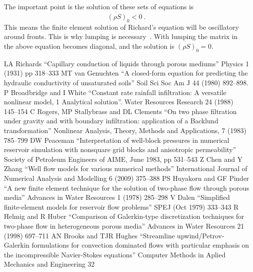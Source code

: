 \documentclass[]{scrreprt}
\begin{document}
The important point is the solution of these sets of equations is
\begin{equation}
\dot{(\rho S)}_{0} < 0 \ .
\end{equation}
This means the finite element solution of Richard's equation will be
oscillatory around fronts.  This is why lumping is
necessary~\cite{celiaET1990}.  With lumping the matrix in the above
equation becomes diagonal, and the solution is $\dot{(\rho S)}_{0} =
0$.







\begin{thebibliography}{99}
LA Richards ``Capillary conduction of
  liquids through porous mediums''   Physics 1 (1931) pp 318--333
MT van Genuchten ``A closed-form equation
  for predicting the hydraulic conductivity of unsaturated soils''
  Soil Sci Soc Am J 44 (1980) 892--898.
P Broadbridge and I White ``Constant rate rainfall
  infiltration: A versatile nonlinear model, 1 Analytical solution''.
  Water Resources Research 24 (1988) 145--154
C Rogers, MP Stallybrass and DL Clements ``On two
  phase filtration under gravity and with boundary infiltration:
  application of a Backlund transformation'' Nonlinear Analysis,
  Theory, Methods and Applications, 7 (1983) 785--799
DW Peaceman ``Interpretation of well-block
  pressures in numerical reservoir simulation with nonsquare grid
  blocks and anisotropic permeability'' Society of Petroleum Engineers
  of AIME, June 1983, pp 531--543
Z Chen and Y Zhang ``Well flow models for various
  numerical methods'' International Journal of Numerical Analysis and
  Modelling 6 (2009) 375--388
PS Huyakorn and GF Pinder ``A new finite element
  technique for the solution of two-phase flow through porous media''
  Advances in Water Resources 1 (1978) 285--298
V Dalen ``Simplified finite-element models for
  reservoir flow problems'' SPEJ (Oct 1979) 333--343
R Helmig and R Huber ``Comparison of Galerkin-type
  discretization techniques for two-phase flow in heterogeneous porous
  media''  Advances in Water Resources 21 (1998) 697--711
AN Brooks and TJR Hughes ``Streamline
  upwind/Petrov-Galerkin formulations for convection dominated flows
  with particular emphasis on the incompressible Navier-Stokes
  equations''  Computer Methods in Aplied Mechanics and Engineering 32

\end{thebibliography}
\end{document}

